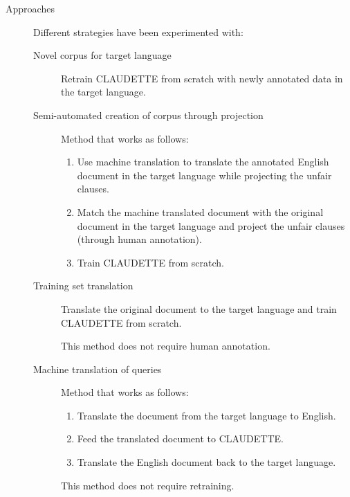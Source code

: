 \begin{description}
    \item[Approaches] Different strategies have been experimented with:
    \begin{description}
        \item[Novel corpus for target language] 
            Retrain CLAUDETTE from scratch with newly annotated data in the target language.

        \item[Semi-automated creation of corpus through projection] 
            Method that works as follows:
            \begin{enumerate}
                \item Use machine translation to translate the annotated English document in the target language while projecting the unfair clauses.
                \item Match the machine translated document with the original document in the target language and project the unfair clauses (through human annotation).
                \item Train CLAUDETTE from scratch.
            \end{enumerate}

        \item[Training set translation] 
            Translate the original document to the target language and train CLAUDETTE from scratch.

            \begin{remark}
                This method does not require human annotation.
            \end{remark}

        \item[Machine translation of queries] 
            Method that works as follows:
            \begin{enumerate}
                \item Translate the document from the target language to English.
                \item Feed the translated document to CLAUDETTE.
                \item Translate the English document back to the target language.
            \end{enumerate}
            
            \begin{remark}
                This method does not require retraining.
            \end{remark}
    \end{description}
\end{description}



